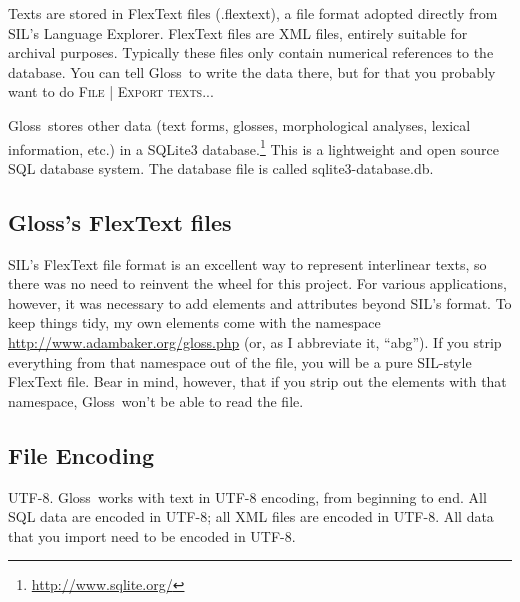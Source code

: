 \documentclass[oneside]{book}
\def\menu#1{\textsc{#1}}
\def\menu#1#2{\textsc{#1 | #2}}
\def\gloss{\textsf{Gloss}}
\begin{document}
Texts are stored in FlexText files (.flextext), a file format adopted directly from SIL's Language Explorer. FlexText files are XML files, entirely suitable for archival purposes. Typically these files only contain numerical references to the database. You can tell \gloss\ to write the data there, but for that you probably want to do \menu{File}{Export texts...}

\gloss\ stores other data (text forms, glosses, morphological analyses, lexical information, etc.) in a SQLite3 database.\footnote{\url{http://www.sqlite.org/}} This is a lightweight and open source SQL database system. The database file is called sqlite3-database.db.

\subsection{Gloss's FlexText files}
SIL's FlexText file format is an excellent way to represent interlinear texts, so there was no need to reinvent the wheel for this project. For various applications, however, it was necessary to add elements and attributes beyond SIL's format. To keep things tidy, my own elements come with the namespace \url{http://www.adambaker.org/gloss.php} (or, as I abbreviate it, ``abg''). If you strip everything from that namespace out of the file, you will be a pure SIL-style FlexText file. Bear in mind, however, that if you strip out the elements with that namespace, \gloss\ won't be able to read the file.

\subsection{File Encoding}
UTF-8. \gloss\ works with text in UTF-8 encoding, from beginning to end. All SQL data are encoded in UTF-8; all XML files are encoded in UTF-8. All data that you import need to be encoded in UTF-8.
\end{document}
